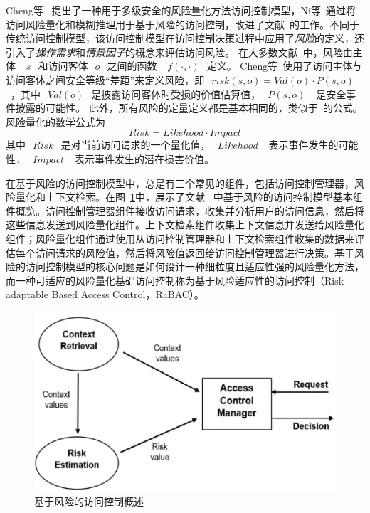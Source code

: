 Cheng等~\cite{cheng2007fuzzy} 提出了一种用于多级安全的风险量化方法访问控制模型，Ni等~\cite{ni2010risk}通过将访问风险量化和模糊推理用于基于风险的访问控制，改进了文献~\cite{cheng2007fuzzy}的工作。不同于传统访问控制模型，该访问控制模型在访问控制决策过程中应用了\emph{风险}的定义，还引入了\emph{操作需求}和\emph{情景因子}的概念来评估访问风险。 在大多数文献~\cite{cheng2007fuzzy,ni2010risk,kandala2011attribute,bijon2012risk}中，风险由主体 ~$~s~$~和访问客体~$~o~$~之间的函数 ~$~f(\cdot, \cdot)~$~定义。 Cheng等~\cite{cheng2007fuzzy}使用了访问主体与访问客体之间安全等级“差距”来定义风险，即~$~risk(s,o)=Val(o) \cdot P(s,o)~$~，其中~$~Val(o)~$~是披露访问客体时受损的价值估算值，~$~P(s,o)~$~ 是安全事件披露的可能性。 此外，所有风险的定量定义都是基本相同的，类似于~\cite{cheng2007fuzzy}的公式。 风险量化的数学公式为
\begin{equation}\label{eq:naive_risk}
Risk = Likehood \cdot Impact
\end{equation}
其中~$~Risk~$~是对当前访问请求的一个量化值，~$~Likehood~$~ 表示事件发生的可能性，~$~Impact~$~ 表示事件发生的潜在损害价值。


在基于风险的访问控制模型中，总是有三个常见的组件，包括访问控制管理器，风险量化和上下文检索。在图~\ref{fig:rbac}中，展示了文献 ~\cite{diep2007enforcing}中基于风险的访问控制模型基本组件概览。访问控制管理器组件接收访问请求，收集并分析用户的访问信息，然后将这些信息发送到风险量化组件。上下文检索组件收集上下文信息并发送给风险量化组件；风险量化组件通过使用从访问控制管理器和上下文检索组件收集的数据来评估每个访问请求的风险值，然后将风险值返回给访问控制管理器进行决策。基于风险的访问控制模型的核心问题是如何设计一种细粒度且适应性强的风险量化方法，而一种可适应的风险量化基础访问控制称为基于风险适应性的访问控制（Risk adaptable Based Access Control，RaBAC）。

\begin{figure}[htb]
	\centering
	\includegraphics[width=.6\textwidth]{./figures/fig-rbac.jpg}
	\caption{基于风险的访问控制概述~\cite{diep2007enforcing}}\label{fig:rbac}
\end{figure}

